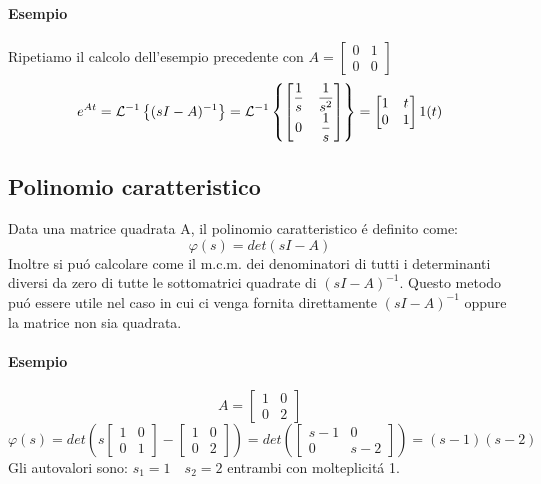 \documentclass[../main.tex]{subfiles}
\begin{document}
\begin{itemize}
\begin{mdframed}[style=Esempio]
					\paragraph{Esempio}
					Ripetiamo il calcolo dell'esempio precedente con $ A = \begin{bmatrix} 0 & 1\\ 0 & 0 \end{bmatrix} $
					\[
						e^{At} = \mathcal{L}^{-1} \left\lbrace (sI-A)^{-1} \right\rbrace =
						\mathcal{L}^{-1} \left\lbrace 
							\begin{bmatrix}
								\dfrac{1}{s} & \dfrac{1}{s^2}
								\\[0.5em]
								0 & \dfrac{1}{s}
							\end{bmatrix}
						 \right\rbrace = 
						\begin{bmatrix}
							1 & t\\
							0 & 1
						\end{bmatrix} 1(t)
					\]
				\end{mdframed}
		\end{itemize}
	
	\subsection{Polinomio caratteristico}
		Data una matrice quadrata A, il polinomio caratteristico \'e definito come:
		\[ 
			\varphi(s) = det(sI - A)
		\]
		Inoltre si pu\'o calcolare come il m.c.m. dei denominatori di tutti i determinanti diversi da zero di tutte le sottomatrici quadrate di $ (sI-A)^{-1} $. Questo metodo pu\'o essere utile nel caso in cui ci venga fornita direttamente $ (sI-A)^{-1} $ oppure la matrice non sia quadrata.
		
		\begin{mdframed}[style=Esempio]
			\paragraph{Esempio}
			\[ 
				A = 
				\begin{bmatrix}
					1 & 0\\
					0 & 2
				\end{bmatrix}
			\]
			\[
				\varphi(s) = det \left( s 
				\begin{bmatrix}
					1 & 0\\
					0 & 1
				\end{bmatrix} -
				\begin{bmatrix}
					1 & 0\\
					0 & 2
				\end{bmatrix} \right) = det \left( 
				\begin{bmatrix}
					s-1 & 0\\
					0 & s-2
				\end{bmatrix} \right) = (s-1)(s-2)
			\]
			Gli autovalori sono: $ s_1 = 1 \quad s_2 = 2 $ entrambi con molteplicit\'a 1.
		\end{mdframed}
		
\end{document}
